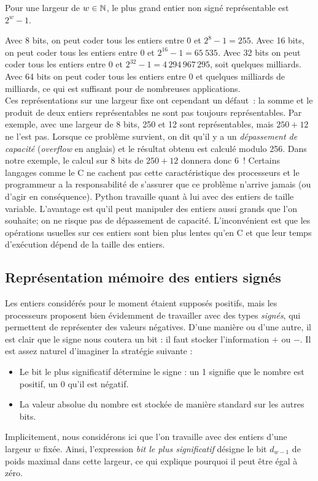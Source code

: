 \documentclass{magnolia}
\begin{document}
\begin{proposition}
Pour une largeur de $w\in\mathbb{N}$, le plus grand entier non signé représentable est $2^{w} - 1$.
\end{proposition}

Avec 8 bits, on peut coder tous les entiers entre 0 et $2^8-1=255$. 
Avec 16 bits, on peut coder tous les entiers entre 0 et $2^{16}-1=65\ 535$.
Avec 32 bits on peut coder
tous les entiers entre 0 et $2^{32}-1=4\,294\,967\,295$, soit quelques milliards. Avec
64 bits on peut coder tous les entiers entre 0 et quelques milliards de milliards, ce qui
est suffisant pour de nombreuses applications.\\

Ces représentations sur une largeur fixe ont cependant un défaut~: la somme et le produit de deux
entiers représentables ne sont pas toujours représentables. Par exemple, avec une largeur
de 8 bits, 250 et 12 sont représentables, mais $250+12$ ne l'est pas. Lorsque ce problème
survient, on dit qu'il y a un \emph{dépassement de capacité} (\emph{overflow} en anglais)
et le résultat obtenu est calculé modulo 256. Dans notre exemple, le calcul sur 8 bits
de $250+12$ donnera donc 6~! Certains langages comme le C ne cachent pas cette
caractéristique des processeurs et le programmeur a la responsabilité de s'assurer que
ce problème n'arrive jamais (ou d'agir en conséquence).
Python travaille quant à lui avec des entiers de taille variable. L'avantage est qu'il peut manipuler des
entiers aussi grands que l'on souhaite; on ne risque pas de dépassement de capacité.
L'inconvénient est que les opérations usuelles sur ces entiers sont bien plus lentes
qu'en C et que leur temps d'exécution dépend de la taille des
entiers.




\subsection{Représentation mémoire des entiers signés}


Les entiers considérés pour le moment étaient supposés positifs,
mais les processeurs proposent bien évidemment de travailler avec des types
\emph{signés}, qui permettent de représenter des valeurs négatives.
D'une manière ou d'une autre, il est clair que le signe nous \og coutera \fg un bit : il faut
stocker l'information $+$ ou  $-$. Il est assez naturel d'imaginer la stratégie
suivante :
\begin{itemize}
  \item Le bit le plus significatif détermine le signe : un 1 signifie que le nombre est
  positif, un 0 qu'il est négatif.
  \item La valeur absolue du nombre est stockée de manière standard sur les autres bits.
\end{itemize}
Implicitement, nous considérons ici que l'on travaille avec
des entiers d'une largeur $w$ fixée. Ainsi, l'expression \emph{bit le plus
  significatif} désigne le bit $d_{w-1}$ de poids maximal dans cette largeur, ce qui explique pourquoi il peut être égal à zéro.\\
\end{document}
